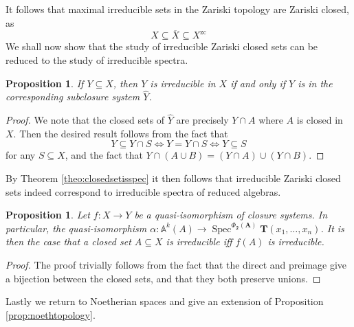 \documentclass{article}
\theoremstyle{plain}
\newtheorem{proposition}[theorem]{Proposition}
\theoremstyle{definition}
\newcommand{\Spec}{\operatorname{Spec}}
\begin{document}
It follows that maximal irreducible sets in the Zariski topology are Zariski closed, as
$$X\subseteq \overline{X} \subseteq X^{\text{zc}}$$
We shall now show that the study of irreducible Zariski closed sets can be reduced to the study of irreducible spectra.

\begin{proposition}
    If $Y \subseteq X$, then $Y$ is irreducible in $X$ if and only if $Y$ is in the corresponding subclosure system $\hat{Y}$.
\end{proposition}
\begin{proof}
    We note that the closed sets of $\hat{Y}$ are precisely $Y\cap A$ where $A$ is closed in $X$.
    Then the desired result follows from the fact that
    $$Y \subseteq Y \cap S \iff Y = Y\cap S \iff Y\subseteq S$$
    for any $S \subseteq X$, and the fact that $Y\cap (A \cup B) = (Y\cap A) \cup (Y\cap B)$.
\end{proof}

By Theorem \ref{theo:closedsetisspec} it then follows that irreducible Zariski closed sets indeed correspond to irreducible spectra of reduced algebras.

\begin{proposition}
    Let $f \colon X \rightarrow Y$ be a quasi-isomorphism of closure systems.
    In particular, the quasi-isomorphism $\alpha \colon \mathbb{A}^k(A) \rightarrow \Spec^{\Phi_\mathfrak{F}(\mathbf{A})} \mathbf{T}(x_1, \dots, x_n)$.
    It is then the case that a closed set $A \subseteq X$ is irreducible iff $f(A)$ is irreducible.
\end{proposition}
\begin{proof}
    The proof trivially follows from the fact that the direct and preimage give a bijection between the closed sets, and that they both preserve unions.
\end{proof}


Lastly we return to Noetherian spaces and give an extension of Proposition \ref{prop:noethtopology}.
\end{document}
